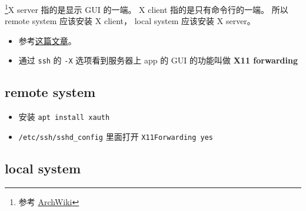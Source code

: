 
\begin{issues}
\issueDraft
\end{issues}

\footnote{参考 \href{https://wiki.archlinux.org/title/xorg}{ArchWiki}}X server 指的是显示 GUI 的一端。 X client 指的是只有命令行的一端。 所以 remote system 应该安装 X client， local system 应该安装 X server。

\begin{itemize}
\item 参考\href{https://ostechnix.com/how-to-configure-x11-forwarding-using-ssh-in-linux/}{这篇文章}。
\item 通过 \verb`ssh` 的 \verb`-X` 选项看到服务器上 app 的 GUI 的功能叫做 \textbf{X11 forwarding}
\end{itemize}


\subsection{remote system}
\begin{itemize}
\item 安装 \verb`apt install xauth`
\item \verb`/etc/ssh/sshd_config` 里面打开 \verb`X11Forwarding yes`
\end{itemize}


\subsection{local system}
